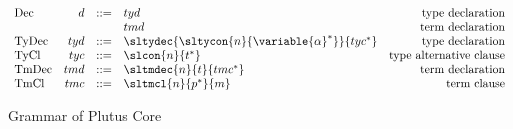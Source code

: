 \documentclass[../plutus-core-specification.tex]{subfiles}
\begin{document}
\begin{figure}[!Ht]
\[\begin{array}{lrclr}
        \textrm{Dec}   & d   & ::= & tyd                          & \textrm{type declaration}\\
                       &     &     & tmd                          & \textrm{term declaration}\\
        \textrm{TyDec} & tyd & ::= & \sltydec{
                                        \sltycon{n}
                                         {\variable{\alpha}^*}
                                     }{tyc^*}                     & \textrm{type declaration}\\
        \textrm{TyCl}  & tyc & ::= & \slcon{n}{t^*}               & \textrm{type alternative clause}\\
        \textrm{TmDec} & tmd & ::= & \sltmdec{n}{t}{tmc^*}       & \textrm{term declaration}\\
        \textrm{TmCl}  & tmc & ::= & \sltmcl{n}{p^*}{m}           & \textrm{term clause}\\
    \end{array}\]
    \caption{Grammar of Plutus Core}
    \label{fig:Plutus_grammar}
\end{figure}
\end{document}
